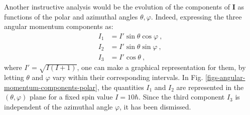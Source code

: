 Another instructive analysis would be the evolution of the components of $\mathbf{I}$ as functions of the polar and azimuthal angles $\theta,\varphi$. Indeed, expressing the three angular momentum components as:
\begin{align}
    I_1&=I'\sin\theta\cos\varphi\ ,\\
    I_2&=I'\sin\theta\sin\varphi\ ,\\
    I_3&=I'\cos\theta\ ,
    \label{angular-momentum-polar-components}
\end{align}
where $I'=\sqrt{I(I+1)}$, one can make a graphical representation for them, by letting $\theta$ and $\varphi$ vary within their corresponding intervals. In Fig. \ref{figs-angular-momentum-components-polar}, the quantities $I_1$ and $I_2$ are represented in the $(\theta,\varphi)$ plane for a fixed spin value $I=10\hbar$. Since the third component $I_3$ is independent of the azimuthal angle $\varphi$, it has been dismissed.


